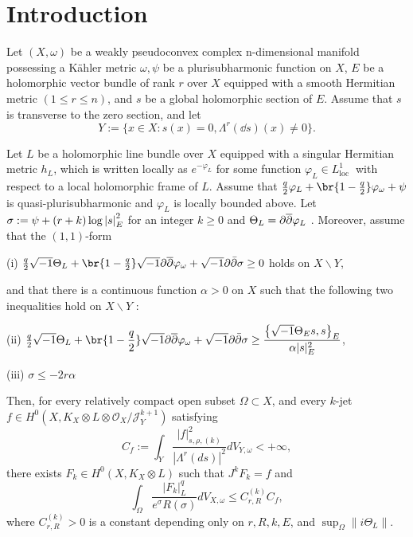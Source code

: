\documentclass[lang=cn,12pt,fontset=none,a4paper]{beautybook}
\begin{document}
\section{Introduction}
\begin{theorem}
   Let $(X, \omega)$ be a weakly pseudoconvex complex n-dimensional manifold possessing a Kähler metric $\omega, \psi$ be a plurisubharmonic function on $X$, $E$ be a holomorphic vector bundle of rank $r$ over $X$ equipped with a smooth Hermitian metric $(1 \leq r\leq n)$, and $s$ be a global holomorphic section of $E$. Assume that $s$ is transverse to the zero section, and let
   $$
      Y:=\{x \in X: s(x)=0, \Lambda^r (\dd s)(x)\neq 0\} .
   $$
   
   Let $L$ be a holomorphic line bundle over $X$ equipped with a singular Hermitian metric $h_L$, which is written locally as $e^{-\varphi_L}$ for some function $\varphi_L \in L_{\text {loc }}^1$ with respect to a local holomorphic frame of $L$. Assume that $\frac{q}{2}\varphi_L+\br{1-\frac{q}{2}}\varphi_\omega+\psi$ is quasi-plurisubharmonic and $\varphi_L$ is locally bounded above. Let $\sigma:=\psi+(r+k)\log \abs{s}^2_E$  for an integer $k\geqslant 0$  and $\Theta_L=\partial\overline{\partial}\varphi_L$ .  Moreover, assume that the $(1,1)$-form
   
   (i) $\frac{q}{2}\sqrt{-1} \Theta_L+\br{1-\frac{q}{2}}\sqrt{-1}\partial\bdd\varphi_\omega+ \sqrt{-1} \partial \bar{\partial} \sigma \geq 0$ holds on $X \backslash Y$,
   
   and that there is a continuous function $\alpha>0$ on $X$ such that the following two inequalities hold on $X \backslash Y$ :
   
   (ii) $\frac{q}{2}\displaystyle\sqrt{-1} \Theta_L+\br{1-\frac{q}{2}}\sqrt{-1}\partial\bdd\varphi_\omega+\sqrt{-1} \partial \bar{\partial} \sigma \geq \frac{\left\{\sqrt{-1} \Theta_E s, s\right\}_E}{\alpha|s|_E^2}$,
   
   (iii) $\sigma\leq-2 r \alpha$
   
   Then, for every relatively compact open subset $\Omega \subset X$, and every $k$-jet $f \in H^0\left(X, K_X\otimes L \otimes \mathcal{O}_X / \mathcal{J}_Y^{k+1}\right)$ satisfying
   $$
      C_f :=\int_Y \frac{|f|_{s, \rho,(k)}^2}{\left|\Lambda^r(d s)\right|^{2} }d V_{Y, \omega}<+\infty,
   $$
   there exists $F_k \in H^0\left(X, K_X \otimes L\right)$ such that $J^k F_k=f$ and
   $$
      \int_{\Omega} \frac{\left|F_k\right|_L^q}{e^\sigma R(\sigma)} d V_{X, \omega} \leq C_{r,R}^{(k)} C_f,
   $$
   where $C_{r,R}^{(k)}>0$ is a constant depending only on $r, R,k, E$, and $\sup _{\Omega}\|i \Theta_L\|$.
   
\end{theorem}
\end{document}
